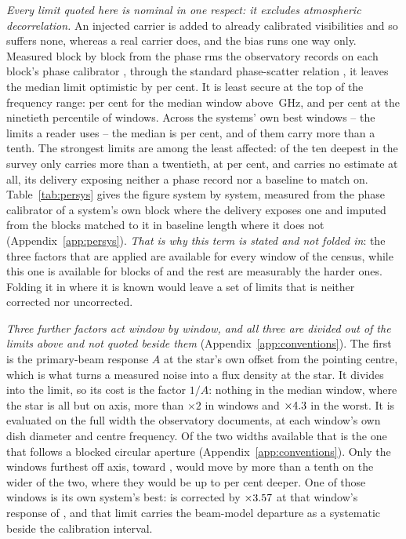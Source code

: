 \emph{Every limit quoted here is nominal in one respect: it excludes
atmospheric decorrelation.} An injected carrier is added to already
calibrated visibilities and so suffers none, whereas a real carrier does, and
the bias runs one way only. Measured block by block from the phase rms the
observatory records on each block's phase calibrator
\citep[\S\S10.4.11, 11.3.1]{ALMAHandbook}, through the standard phase-scatter
relation \citep[Eq.~3]{Richards2022}, it leaves the median limit optimistic
by \SensDecorPct{} per cent. It is least secure at the top of the frequency
range: \SensDecorHiPct{} per cent for the median window above
\SensDecorHiGHz\,GHz, and \NmDecHiPct{} per cent at the ninetieth percentile
of windows. Across the systems' own best windows -- the limits a reader uses -- the
median is \NmDecSysMedPct{} per cent, and \NmDecNBigSys{} of them carry more
than a tenth. The strongest limits are among the least affected: of the ten
deepest in the survey only \NmDecDeepBigSys{} carries more than a twentieth,
at \NmDecDeepBigPct{} per cent, and \NmDecNoRecSys{} carries no estimate at
all, its delivery exposing neither a phase record nor a baseline to match on.
Table~\ref{tab:persys} gives the figure system by system, measured from the
phase calibrator of a system's own block where the delivery exposes one and
imputed from the blocks matched to it in baseline length where it does not
(Appendix~\ref{app:persys}). \emph{That is why this term is stated and not
folded in}: the three factors that are applied are available for every window
of the census, while this one is available for \SensDecorNBlk{} blocks of
\SensDecorNBlkTot{} and the rest are measurably the harder ones. Folding it
in where it is known would leave a set of limits that is neither corrected
nor uncorrected.

\emph{Three further factors act window by window, and all three are divided
out of the limits above and not quoted beside them}
(Appendix~\ref{app:conventions}). The first is the primary-beam response
$A$ at the star's own offset from the pointing centre, which is what turns a
measured noise into a flux density at the star. It divides into the limit, so its
cost is the factor $1/A$: nothing in the median window, where the star is all
but on axis, more than $\times2$ in \NmBeamNFacTwo{} windows and
$\times4.3$ in the worst. It is evaluated on the full width the
observatory documents, at each window's own dish diameter and centre
frequency. Of the two widths available that is the one that follows a blocked
circular aperture (Appendix~\ref{app:conventions}). Only the
\BmNAboveTenPct{} windows furthest off axis, toward \BnStarList, would move
by more than a tenth on the wider of the two, where they would be up to
\BmShiftMaxPct{} per cent deeper. One of those windows is its own system's
best: \BnBestSys{} is corrected by $\times3.57$ at that window's
response of \BnBestResp, and that limit carries the beam-model departure as a
systematic beside the calibration interval.


